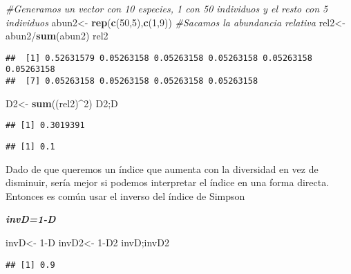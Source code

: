 \documentclass[]{book}
\newenvironment{Shaded}{\begin{snugshade}}{\end{snugshade}}
\newcommand{\KeywordTok}[1]{\textcolor[rgb]{0.13,0.29,0.53}{\textbf{{#1}}}}
\newcommand{\DecValTok}[1]{\textcolor[rgb]{0.00,0.00,0.81}{{#1}}}
\newcommand{\StringTok}[1]{\textcolor[rgb]{0.31,0.60,0.02}{{#1}}}
\newcommand{\CommentTok}[1]{\textcolor[rgb]{0.56,0.35,0.01}{\textit{{#1}}}}
\newcommand{\NormalTok}[1]{{#1}}
\begin{document}
\begin{Shaded}
\begin{Highlighting}[]
\CommentTok{#Generamos un vector con 10 especies, 1 con 50 individuos y el resto con 5 individuos}
\NormalTok{abun2<-}\StringTok{ }\KeywordTok{rep}\NormalTok{(}\KeywordTok{c}\NormalTok{(}\DecValTok{50}\NormalTok{,}\DecValTok{5}\NormalTok{),}\KeywordTok{c}\NormalTok{(}\DecValTok{1}\NormalTok{,}\DecValTok{9}\NormalTok{))}
\CommentTok{#Sacamos la abundancia relativa}
\NormalTok{rel2<-}\StringTok{ }\NormalTok{abun2/}\KeywordTok{sum}\NormalTok{(abun2)}
\NormalTok{rel2}
\end{Highlighting}
\end{Shaded}

\begin{verbatim}
##  [1] 0.52631579 0.05263158 0.05263158 0.05263158 0.05263158 0.05263158
##  [7] 0.05263158 0.05263158 0.05263158 0.05263158
\end{verbatim}

\begin{Shaded}
\begin{Highlighting}[]
\NormalTok{D2<-}\StringTok{ }\KeywordTok{sum}\NormalTok{((rel2)^}\DecValTok{2}\NormalTok{)}
\NormalTok{D2;D}
\end{Highlighting}
\end{Shaded}

\begin{verbatim}
## [1] 0.3019391
\end{verbatim}

\begin{verbatim}
## [1] 0.1
\end{verbatim}

Dado de que queremos un índice que aumenta con la diversidad en vez de
disminuir, sería mejor si podemos interpretar el índice en una forma
directa. Entonces es común usar el inverso del índice de Simpson

\textbf{\emph{invD=1-D}}

\begin{Shaded}
\begin{Highlighting}[]
\NormalTok{invD<-}\StringTok{ }\DecValTok{1}\NormalTok{-D}
\NormalTok{invD2<-}\StringTok{ }\DecValTok{1}\NormalTok{-D2}
\NormalTok{invD;invD2}
\end{Highlighting}
\end{Shaded}

\begin{verbatim}
## [1] 0.9
\end{verbatim}
\end{document}
